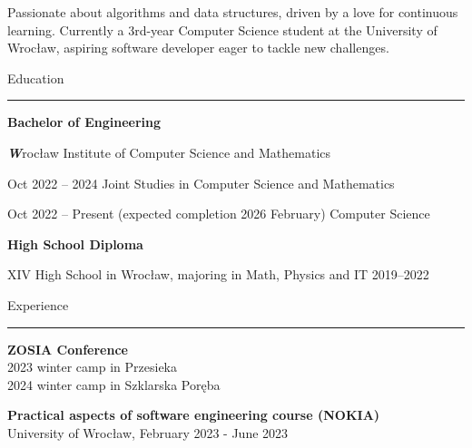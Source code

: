 \documentclass{letter}
\begin{document}
\hfill
\begin{minipage}[t]{0.70\textwidth}
\setlength{\baselineskip}{1.5\baselineskip}

\begin{tcolorbox}[colback=white, colframe=white, width=\textwidth, boxrule=0pt, sharp corners, height=\textheight, left=5mm, right=5mm, top=5mm, bottom=5mm]

\color{black}

\vspace{0.5cm}
{\fontsize{30pt}{1pt} \textbf \FullName}

\vspace{0.3cm}

\begin{spacing}{1.125}
\small 
Passionate about algorithms and data structures, driven by a love for continuous learning. Currently a 3rd-year Computer Science student at the University of Wrocław, aspiring software developer eager to tackle new challenges.

\end{spacing}

\vspace{\SectionSpacing}

{\large Education}
\rule{\linewidth}{0.4pt}

{\large \textbf{Bachelor of Engineering}} 

{ 
{\textit \textbf Wrocław Institute of Computer Science and Mathematics}

{\small Oct 2022 -- 2024}
{Joint Studies in Computer Science and Mathematics }

{\small Oct 2022 -- Present (expected completion 2026 February)}
{Computer Science}

}

{\large \textbf{High School Diploma}}

{ 
{\small XIV High School in Wrocław, majoring in Math, Physics and IT  2019--2022}

}

\vspace{\SectionSpacing}

{\large Experience}
\rule{\linewidth}{0.4pt}

{ 
\vspace{1mm}
\textbf{ZOSIA Conference} \\
{\small 2023 winter camp in Przesieka} \\
{\small 2024 winter camp in Szklarska Poręba}

\vspace{1mm}
\textbf{Practical aspects of software engineering course (NOKIA)} \\
{\small University of Wrocław, February 2023 - June 2023}

}
\end{tcolorbox}
\end{minipage}
\end{document}
